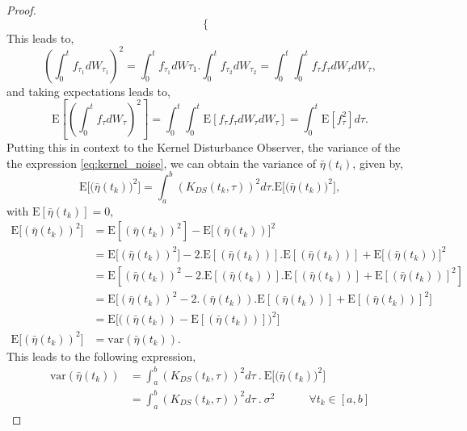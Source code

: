 \documentclass[letterpaper%
, twoside%
, 12pt%
,memoire%
, english%
,creativecommons,hyperref%
]{thETS}
\theoremstyle{newThmStyle}
\begin{document}
\begin{proof}
\[\begin{cases}
   \end{cases}
\]
This leads to, 
$$
\left(\int_0^t f_{\tau_1} dW_{\tau_1} \right)^2 = \int_0^t f_{\tau_1} dW{\tau_1} . \int_0^t f_{\tau_2} dW_{\tau_2} = \int_0^t \int_0^t f_{\tau} f_{\tau} dW_\tau dW_\tau, 
$$ 
and taking expectations leads to,
$$
\text{E} \left[ \left(  \int_0^t f_\tau dW_\tau \right)^2 \right] = \int_0^t \int_0^t \text{E}[f_{\tau} f_{\tau} dW_\tau dW_\tau] = \int_0^t \text{E}\left[ f_\tau^2\right] d\tau. 
$$ 
Putting this in context to the Kernel Disturbance Observer, the variance of the the expression \ref{eq:kernel_noise}, we can obtain the variance of $\bar{\eta}(t_i)$, given by, 
\begin{equation}
\text{E}\Big[\big(\bar{\eta}(t_k)\big)^2\Big] = \int_a^b \left(K_{DS}(t_k,\tau)\right)^2 d\tau . \text{E}\Big[\big( \bar{\eta}(t_k) \big)^2\Big], 	
\end{equation}
with $\text{E}[\bar{\eta}(t_k)]=0$,
\begin{align*}
\text{E}\big[(\bar{\eta}(t_k))^2] &= \text{E}[(\bar{\eta}(t_k))^2] - \text{E}[(\bar{\eta}(t_k))\big]^2 \\
&= \text{E}\big[(\bar{\eta}(t_k))^2] - 2. \text{E}[(\bar{\eta}(t_k))].\text{E}[(\bar{\eta}(t_k))] + \text{E}[(\bar{\eta}(t_k))\big]^2 \\
&= \text{E}[(\bar{\eta}(t_k))^2 - 2.\text{E}[(\bar{\eta}(t_k))].\text{E}[(\bar{\eta}(t_k))] + \text{E}[(\bar{\eta}(t_k))]^2 ] \\
&= \text{E}\big[(\bar{\eta}(t_k))^2 - 2.(\bar{\eta}(t_k)).\text{E}[(\bar{\eta}(t_k))] + \text{E}[(\bar{\eta}(t_k))]^2 \big] \\
&= \text{E}\Big[\big((\bar{\eta}(t_k))- \text{E}[(\bar{\eta}(t_k))]\big)^2 \Big] \\
\text{E}\big[(\bar{\eta}(t_k))^2] &= \text{var}(\bar{\eta}(t_k)).
\end{align*}
This leads to the following expression,
\begin{equation} \label{eqn:stoch1}
\begin{aligned}
\text{var}(\bar{\eta}(t_k)) &= \int_a^b \left(K_{DS}(t_k,\tau)\right)^2 d\tau \ . \ \text{E}\Big[\big( \bar{\eta}(t_k) \big)^2\Big] \\
&= \int_a^b \left(K_{DS}(t_k,\tau)\right)^2 d\tau \ . \  \sigma^2 \quad \quad \quad \forall t_k \in [a,b]
\end{aligned}
\end{equation}
\end{proof}
\end{document}
